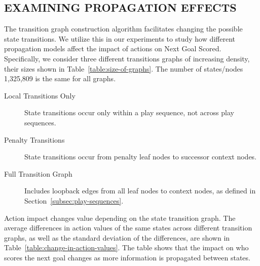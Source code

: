 \documentclass[]{article}
\begin{document}
\subsection{EXAMINING PROPAGATION EFFECTS}
\label{subsec:lesion-study}


The transition graph construction algorithm facilitates changing the possible state transitions. We utilize this in our experiments to study how different propagation models affect the impact of actions on Next Goal Scored. Specifically, we consider three different transitions graphs of increasing density, their sizes shown in Table~\ref{table:size-of-graphs}. The number of states/nodes 1,325,809 is the same for all graphs.

\begin{description}
\item[Local Transitions Only]  State transitions occur only within a play sequence, not across play sequences.
\item[Penalty Transitions] State transitions occur from penalty leaf nodes to successor context nodes.
\item[Full Transition Graph] Includes loopback edges from all leaf nodes to context nodes, as defined in Section~\ref{subsec:play-sequences}.
\end{description}

\begin{table}[htb]
\caption{Size of State Transition Graphs}
\label{table:size-of-graphs}
\begin{center}
\end{center}
\end{table}


Action impact changes value depending on the state transition graph. The average differences in action values of the same states across different transition graphs, as well as the standard deviation of the differences, are shown in Table~\ref{table:change-in-action-values}. The table shows that the impact on who scores the next goal changes as more information is propagated between states.
\end{document}
